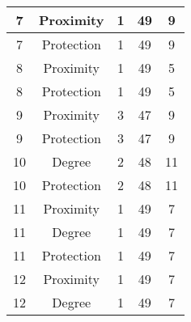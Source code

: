 \documentclass[results.tex]{subfiles}
\begin{document}
\begin{center}
\begin{tabular}{| c || c | c | c | c |}
            \hline
            7                       & Proximity                    & 1                      & 49                      & 9                    \\
            \hline
            7                       & Protection                   & 1                      & 49                      & 9                    \\
            \hline
            8                       & Proximity                    & 1                      & 49                      & 5                    \\
            \hline
            8                       & Protection                   & 1                      & 49                      & 5                    \\
            \hline
            9                       & Proximity                    & 3                      & 47                      & 9                    \\
            \hline
            9                       & Protection                   & 3                      & 47                      & 9                    \\
            \hline
            10                      & Degree                       & 2                      & 48                      & 11                   \\
            \hline
            10                      & Protection                   & 2                      & 48                      & 11                   \\
            \hline
            11                      & Proximity                    & 1                      & 49                      & 7                    \\
            \hline
            11                      & Degree                       & 1                      & 49                      & 7                    \\
            \hline
            11                      & Protection                   & 1                      & 49                      & 7                    \\
            \hline
            12                      & Proximity                    & 1                      & 49                      & 7                    \\
            \hline
            12                      & Degree                       & 1                      & 49                      & 7                    \\

\end{tabular}
\end{center}
\end{document}
